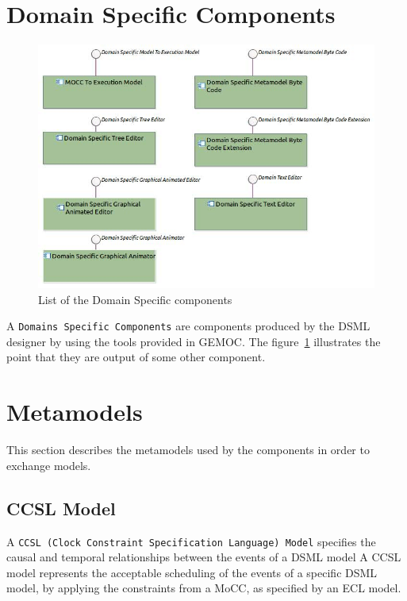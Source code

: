 \documentclass{gemoc} %
\begin{document}
\section{Domain Specific Components}
\begin{figure}[htp]
	\begin{center}
	\includegraphics*[trim=0.0cm 0.0cm 0cm 0.0cm, clip=true, width=1.0\linewidth]{../images/DomainSpecificComponents.jpg}
	\caption{List of the Domain Specific components}
	\label{fig:DomainSpecificComponentList}
	\end{center}
\end{figure}
A \texttt{Domains Specific Components} are components produced by the DSML designer by using the tools provided in GEMOC. The figure~\ref{fig:DomainSpecificComponentList} illustrates the point that they are output of some other component.
\section{Metamodels}
This section describes the metamodels used by the components in order to exchange models.
\subsection{CCSL Model}
\label{sec:CCSL_Model}
A \texttt{CCSL (Clock Constraint Specification Language) Model} specifies the causal and temporal relationships between the events of a DSML model
\newline A CCSL model represents the acceptable scheduling of the events of a specific DSML model, by applying the constraints from a MoCC, as specified by an ECL model.
\end{document}
